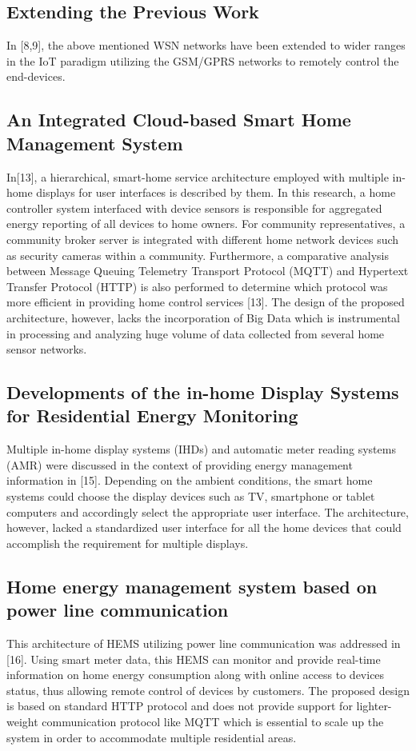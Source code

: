 \documentclass[a4paper,12pt,oneside]{article}
\begin{document}
\subsection{Extending the Previous Work}
In [8,9], the above mentioned WSN networks have been extended
to wider ranges in the IoT paradigm utilizing the GSM/GPRS
networks to remotely control the end-devices.

\subsection{An Integrated Cloud-based Smart Home Management System}
In[13], a hierarchical, smart-home service architecture employed with
multiple in-home displays for user interfaces is described by them.
In this research, a home controller system interfaced
with device sensors is responsible for aggregated energy
reporting of all devices to home owners. For community
representatives, a community broker server is integrated with
different home network devices such as security cameras
within a community. Furthermore, a comparative analysis
between Message Queuing Telemetry Transport Protocol
(MQTT) and Hypertext Transfer Protocol (HTTP) is also
performed to determine which protocol was more efficient in
providing home control services [13]. The design of the
proposed architecture, however, lacks the incorporation of Big
Data which is instrumental in processing and analyzing huge
volume of data collected from several home sensor networks.

\newpage
\subsection{Developments of the in-home Display Systems for Residential Energy Monitoring}
Multiple in-home display systems (IHDs) and automatic
meter reading systems (AMR) were discussed in the context of
providing energy management information in [15]. Depending
on the ambient conditions, the smart home systems could
choose the display devices such as TV, smartphone or tablet
computers and accordingly select the appropriate user
interface. The architecture, however, lacked a standardized
user interface for all the home devices that could accomplish
the requirement for multiple displays.

\subsection{Home energy management system based on power line communication}
This architecture of HEMS utilizing power line communication was addressed
in [16]. Using smart meter data, this HEMS can monitor and provide real-time information on home energy consumption
along with online access to devices status, thus allowing
remote control of devices by customers. The proposed design
is based on standard HTTP protocol and does not provide
support for lighter-weight communication protocol like
MQTT which is essential to scale up the system in order to
accommodate multiple residential areas.
\end{document}
